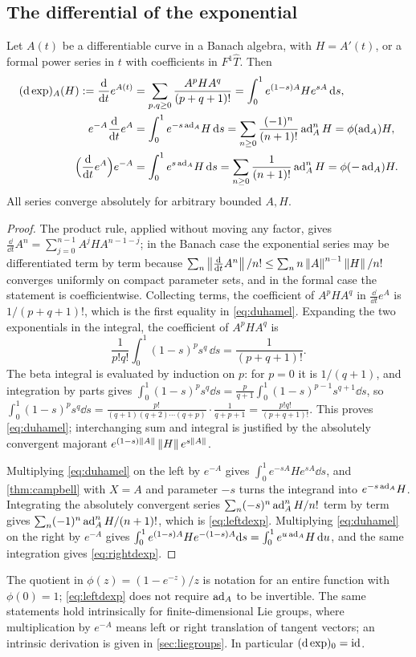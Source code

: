 \subsection{The differential of the exponential}
\begin{theorem}\label{thm:dexp}
Let $A(t)$ be a differentiable curve in a Banach algebra, with $H=A'(t)$,
or a formal power series in $t$ with coefficients in $F^1\widehat T$. Then
\begin{align}
 (\mathrm{d}\exp)_A(H):=\frac{\mathrm{d}}{\mathrm{d} t}e^{A(t)}
 &=\sum_{p,q\geq0}\frac{A^pHA^q}{(p+q+1)!}
 =\int_0^1e^{(1-s)A}He^{sA}\,\mathrm{d} s,\label{eq:duhamel}\\
 e^{-A}\frac{\mathrm{d}}{\mathrm{d} t}e^{A}
 &=\int_0^1e^{-s\operatorname{ad}_A}H\,\mathrm{d} s
 =\sum_{n\geq0}\frac{(-1)^n}{(n+1)!}\operatorname{ad}_A^nH=\phi(\operatorname{ad}_A)H,\label{eq:leftdexp}\\
 \Bigl(\frac{\mathrm{d}}{\mathrm{d} t}e^{A}\Bigr)e^{-A}
 &=\int_0^1e^{s\operatorname{ad}_A}H\,\mathrm{d} s
 =\sum_{n\geq0}\frac{1}{(n+1)!}\operatorname{ad}_A^nH=\phi(-\operatorname{ad}_A)H.\label{eq:rightdexp}
\end{align}
All series converge absolutely for arbitrary bounded $A,H$.
\end{theorem}
\begin{proof}
The product rule, applied without moving any factor, gives
$\frac{\dd}{\dd t}A^n=\sum_{j=0}^{n-1}A^jHA^{n-1-j}$; in the Banach case the
exponential series may be differentiated term by term because
$\sum_n\left\lVert\frac{\mathrm{d}}{\mathrm{d} t}A^n\right\rVert/n!\leq\sum_nn\left\lVert A\right\rVert^{n-1}\left\lVert H\right\rVert/n!$
converges uniformly on compact parameter sets, and in the formal case the
statement is coefficientwise. Collecting terms, the coefficient of $A^pHA^q$
in $\frac{\dd}{\dd t}e^A$ is $1/(p+q+1)!$, which is the first equality in
\eqref{eq:duhamel}. Expanding the two exponentials in the integral, the
coefficient of $A^pHA^q$ is
\[
 \frac1{p!q!}\int_0^1(1-s)^ps^q\,\dd s=\frac{1}{(p+q+1)!}.
\]
The beta integral is evaluated by induction on $p$: for $p=0$ it is
$1/(q+1)$, and integration by parts gives
$\int_0^1(1-s)^ps^q\dd s=\frac{p}{q+1}\int_0^1(1-s)^{p-1}s^{q+1}\dd s$, so
$\int_0^1(1-s)^ps^q\dd s=\frac{p!}{(q+1)(q+2)\cdots(q+p)}\cdot\frac1{q+p+1}
=\frac{p!q!}{(p+q+1)!}$. This proves \eqref{eq:duhamel}; interchanging sum
and integral is justified by the absolutely convergent majorant
$e^{(1-s)\left\lVert A\right\rVert}\left\lVert H\right\rVert e^{s\left\lVert A\right\rVert}$.

Multiplying \eqref{eq:duhamel} on the left by $e^{-A}$ gives
$\int_0^1e^{-sA}He^{sA}\dd s$, and \cref{thm:campbell} with $X=A$ and
parameter $-s$ turns the integrand into $e^{-s\operatorname{ad}_A}H$. Integrating the
absolutely convergent series $\sum_n(-s)^n\operatorname{ad}_A^nH/n!$ term by term gives
$\sum_n(-1)^n\operatorname{ad}_A^nH/(n+1)!$, which is \eqref{eq:leftdexp}. Multiplying
\eqref{eq:duhamel} on the right by $e^{-A}$ gives
$\int_0^1e^{(1-s)A}He^{-(1-s)A}\mathrm{d} s=\int_0^1e^{u\operatorname{ad}_A}H\,\mathrm{d} u$, and the same
integration gives \eqref{eq:rightdexp}.
\end{proof}
The quotient in $\phi(z)=(1-e^{-z})/z$ is notation for an entire function
with $\phi(0)=1$; \eqref{eq:leftdexp} does not require $\operatorname{ad}_A$ to be
invertible. The same statements hold intrinsically for finite-dimensional
Lie groups, where multiplication by $e^{-A}$ means left or right translation
of tangent vectors; an intrinsic derivation is given in \cref{sec:liegroups}.
In particular $(\mathrm{d}\exp)_0=\operatorname{id}$.

